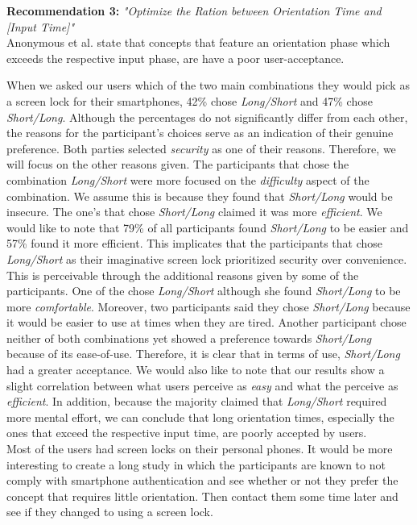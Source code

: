 \textbf{Recommendation 3:} \textit{"Optimize the Ration between Orientation Time and [Input Time]"} \\
Anonymous et al. \cite{anonymous} state that concepts that feature an orientation phase which exceeds the respective input phase, are have a poor user-acceptance. 

When we asked our users which of the two main combinations they would pick as a screen lock for their smartphones, 42\% chose \textit{Long/Short} and 47\% chose \textit{Short/Long}. Although the percentages do not significantly differ from each other, the reasons for the participant's choices serve as an indication of their genuine preference. Both parties selected \textit{security} as one of their reasons.
Therefore, we will focus on the other reasons given. The participants that chose the combination \textit{Long/Short} were more focused on the \textit{difficulty} aspect of the combination. We assume this is because they found that \textit{Short/Long} would be insecure. The one's that chose \textit{Short/Long} claimed it was more \textit{efficient}. We would like to note that 79\% of all participants found \textit{Short/Long} to be easier and 57\% found it more efficient. This implicates that the participants that chose \textit{Long/Short} as their imaginative screen lock prioritized security over convenience. This is perceivable through the additional reasons given by some of the participants. One of the chose \textit{Long/Short} although she found \textit{Short/Long} to be more \textit{comfortable}. Moreover, two participants said they chose \textit{Short/Long} because it would be easier to use at times when they are tired. Another participant chose neither of both combinations yet showed a preference towards \textit{Short/Long} because of its ease-of-use. Therefore, it is clear that in terms of use, \textit{Short/Long} had a greater acceptance. We would also like to note that our results show a slight correlation between what users perceive as \textit{easy} and what the perceive as \textit{efficient}. In addition, because the majority claimed that \textit{Long/Short} required more mental effort, we can conclude that long orientation times, especially the ones that exceed the respective input time, are poorly accepted by users. \\







Most of the users had screen locks on their personal phones. It would be more interesting to create a long study in which the participants are known to not comply with smartphone authentication and see whether or not they prefer the concept that requires little orientation. Then contact them some time later and see if they changed to using a screen lock.


